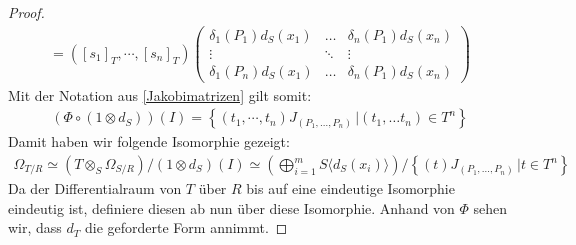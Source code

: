 \documentclass[10pt,a4paper]{report}
\newcommand{\comment}[1]{}
\newcommand{\function}[5]{\nolinebreak{#1:#2 \longrightarrow #3 \, , \, #4 \longmapsto #5}}
\newcommand{\divR}[2]{\Omega_{#1/#2}}
\newcommand{\divf}[1]{d_{#1}}
\newcommand{\Tensor}[3]{#1 \otimes_{#2} #3}
\newcommand{\tensor}[3]{#1 \otimes #3}
\begin{document}
\begin{proof}
\begin{gather*}
=
([s_1]_T , \cdots , [s_n]_T)
\begin{pmatrix}
\delta_1(P_1) \divf{S}(x_1) & \dots & \delta_n(P_1) \divf{S}(x_n)\\
\vdots & \ddots & \vdots \\
\delta_1(P_n) \divf{S}(x_1) & \dots & \delta_n(P_1) \divf{S}(x_n)
\end{pmatrix}
\end{gather*}
Mit der Notation aus \cref{Jakobimatrizen} gilt somit:
\begin{gather*}
(\Phi \circ (\tensor{1}{S}{\divf{S}}))(I) = \left\lbrace (t_1, \cdots, t_n) J_{(P_1,\dots, P_n)} \, \vert (t_1 , \dots t_n) \in T^n \right\rbrace
\end{gather*}
Damit haben wir folgende Isomorphie gezeigt:
\begin{gather*}
\divR{T}{R} 
\simeq (\Tensor{T}{S}{\divR{S}{R}}) / (\tensor{1}{S}{d_{S}})(I) 
\simeq \left( \bigoplus_{i =1}^m S \langle \divf{S}(x_i) \rangle \right) / \left\lbrace (t) J_{(P_1,\dots, P_n)} \, \vert t \in T^n \right\rbrace
\end{gather*}
Da der Differentialraum von $T$ über $R$ bis auf eine eindeutige Isomorphie eindeutig ist, definiere diesen ab nun über diese Isomorphie. Anhand von $\Phi$ sehen wir, dass $\divf{T}$ die geforderte Form annimmt.
\comment{
vl. Falsch
Anhand von $\Phi$ sehen wir, dass $\divf{T}$ folgende Form annimmt.
\begin{gather*}
\function{\divf{T}}{T}{\divR{T}{R}}{\left[Q(x_1,\cdots, x_m)\right]_T}{\left[\delta_1(Q)\divf{S}(x_1), \cdots , \delta_m(Q)\divf{S}(x_m)
\right]_{J_{(P_1 , \dots , P_n)}}}
\end{gather*}
Zeige also noch:
\begin{gather*}
\left( \bigoplus_{i = 1}^m T \langle \divf{S}(x_i) \rangle \right) / \left\lbrace (t_1, \cdots, t_n)
\begin{pmatrix}
\delta_1(P_1) \divf{S}(x_1) & \dots & \delta_m(P_1) \divf{S}(x_m)\\
\vdots & \ddots & \vdots \\
\delta_1(P_n) \divf{S}(x_1) & \dots & \delta_m(P_n) \divf{S}(x_m)
\end{pmatrix}
\, \vert (t_1 , \dots t_n) \in T^n \right\rbrace\\
= \bigoplus_{i  = 1}^m S/(P_1 , \dots , P_n , \delta_{i}(P_1) , \dots \delta_{i}(P_n) \langle \divf{S}(x_i) \rangle)\\
\end{gather*}
Betrachte dazu für $i \in \lbrace 1, \dots , m \brace$ das von $\divf{S}(x_i)$ erzeugte Modul. Dieses erhält durch die $i$-te Spalte von $J_{(P_1,\dots ,P_n)}$ zusätzliche Relationen:
\begin{gather*}
( T \langle \divf{S}(x_i) \rangle ) / \brace (t_1 , \dots ) \lbrace
\end{gather*}
}
\end{proof}
\end{document}
